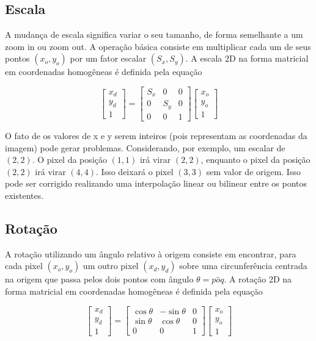 \documentclass[12pt,oneside,a4paper,english,french,spanish,brazil,]{abntex2}
\begin{document}
\subsection{Escala}

A mudança de escala significa variar o seu tamanho, de forma semelhante a um zoom in ou zoom out. A operação básica consiste em multiplicar cada um de seus pontos \((x_o,y_o)\) por um fator escalar \((S_x,S_y)\). A escala 2D na forma matricial em coordenadas homogêneas é definida pela equação

\[
\begin{bmatrix}
x_d\\ 
y_d\\ 
1
\end{bmatrix}
=
\begin{bmatrix}
S_x & 0 & 0\\ 
0 & S_y & 0\\ 
0 & 0 & 1
\end{bmatrix}
\begin{bmatrix}
x_o\\ 
y_o\\ 
1
\end{bmatrix}
\]

O fato de os valores de x e y serem inteiros (pois representam as coordenadas da imagem) pode gerar problemas. Considerando, por exemplo, um escalar de \((2,2)\). O pixel da posição \((1,1)\) irá virar \((2,2)\), enquanto o pixel da posição \((2,2)\) irá virar \((4,4)\). Isso deixará o pixel \((3,3)\) sem valor de origem. Isso pode ser corrigido realizando uma interpolação linear ou bilinear entre os pontos existentes.

\subsection{Rotação}

A rotação utilizando um ângulo  relativo à origem consiste em encontrar, para cada pixel \((x_o,y_o)\) um outro pixel \((x_d,y_d)\) sobre uma circunferência centrada na origem que passa pelos dois pontos com ângulo \(\theta=p \hat{o} q\). A rotação 2D na forma matricial em coordenadas homogêneas é definida pela equação


\[
\begin{bmatrix}
x_d\\ 
y_d\\ 
1
\end{bmatrix}
=
\begin{bmatrix}
\cos{\theta} & -\sin{\theta} & 0\\ 
\sin{\theta} & \cos{\theta} & 0\\ 
0 & 0 & 1
\end{bmatrix}
\begin{bmatrix}
x_o\\ 
y_o\\ 
1
\end{bmatrix}
\]
\end{document}
